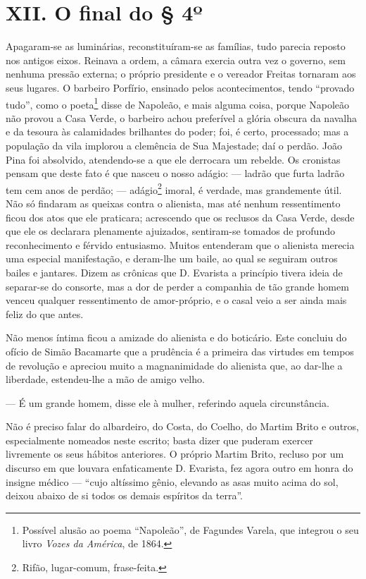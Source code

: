 \chapter{XII. O final do § 4º }

Apagaram-se as luminárias, reconstituíram-se as famílias, tudo parecia
reposto nos antigos eixos. Reinava a ordem, a câmara exercia outra vez o
governo, sem nenhuma pressão externa; o próprio presidente e o vereador
Freitas tornaram aos seus lugares. O barbeiro Porfírio, ensinado pelos
acontecimentos, tendo ``provado tudo'', como o poeta\footnote{Possível
  alusão ao poema ``Napoleão'', de Fagundes Varela, que integrou o seu
  livro \emph{Vozes da América}, de 1864.} disse de Napoleão, e mais
alguma coisa, porque Napoleão não provou a Casa Verde, o barbeiro achou
preferível a glória obscura da navalha e da tesoura às calamidades
brilhantes do poder; foi, é certo, processado; mas a população da vila
implorou a clemência de Sua Majestade; daí o perdão. João Pina foi
absolvido, atendendo-se a que ele derrocara um rebelde. Os cronistas
pensam que deste fato é que nasceu o nosso adágio: --- ladrão que furta
ladrão tem cem anos de perdão; --- adágio\footnote{Rifão, lugar-comum,
  frase-feita.} imoral, é verdade, mas grandemente útil. Não só findaram
as queixas contra o alienista, mas até nenhum ressentimento ficou dos
atos que ele praticara; acrescendo que os reclusos da Casa Verde, desde
que ele os declarara plenamente ajuizados, sentiram-se tomados de
profundo reconhecimento e férvido entusiasmo. Muitos entenderam que o
alienista merecia uma especial manifestação, e deram-lhe um baile, ao
qual se seguiram outros bailes e jantares. Dizem as crônicas que D.
Evarista a princípio tivera ideia de separar-se do consorte, mas a dor
de perder a companhia de tão grande homem venceu qualquer ressentimento
de amor-próprio, e o casal veio a ser ainda mais feliz do que antes.

Não menos íntima ficou a amizade do alienista e do boticário. Este
concluiu do ofício de Simão Bacamarte que a prudência é a primeira das
virtudes em tempos de revolução e apreciou muito a magnanimidade do
alienista que, ao dar-lhe a liberdade, estendeu-lhe a mão de amigo
velho.

--- É um grande homem, disse ele à mulher, referindo aquela
circunstância.

Não é preciso falar do albardeiro, do Costa, do Coelho, do Martim Brito
e outros, especialmente nomeados neste escrito; basta dizer que puderam
exercer livremente os seus hábitos anteriores. O próprio Martim Brito,
recluso por um discurso em que louvara enfaticamente D. Evarista, fez
agora outro em honra do insigne médico --- ``cujo altíssimo gênio,
elevando as asas muito acima do sol, deixou abaixo de si todos os demais
espíritos da terra''.

